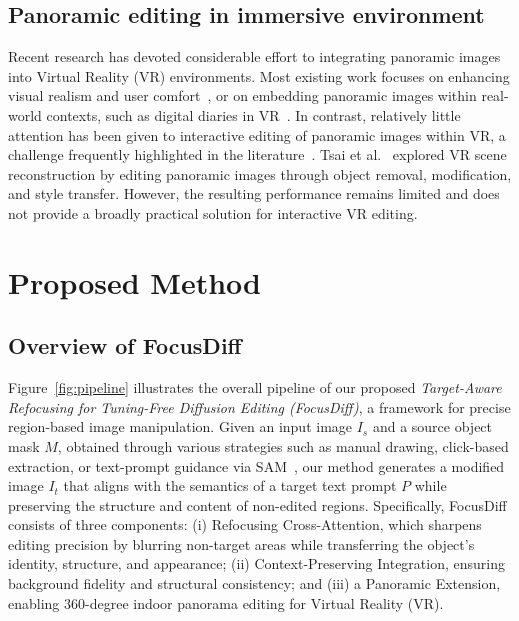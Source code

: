 \documentclass[runningheads]{llncs}
\begin{document}
\subsection{Panoramic editing in immersive environment}
Recent research has devoted considerable effort to integrating panoramic images into Virtual Reality (VR) environments. Most existing work focuses on enhancing visual realism and user comfort~\cite{LayerPano3D,Real_Time_Omnidirectional,PanoTrace,Huang_2025_CVPR}, or on embedding panoramic images within real-world contexts, such as digital diaries in VR~\cite{Digital_dỉaries}. In contrast, relatively little attention has been given to interactive editing of panoramic images within VR, a challenge frequently highlighted in the literature~\cite{tukur2025panoramic}. Tsai et al.~\cite{DreamCraft} explored VR scene reconstruction by editing panoramic images through object removal, modification, and style transfer. However, the resulting performance remains limited and does not provide a broadly practical solution for interactive VR editing.


\section{Proposed Method}

\subsection{Overview of FocusDiff} 

Figure~\ref{fig:pipeline} illustrates the overall pipeline of our proposed \textit{Target-Aware Refocusing for Tuning-Free Diffusion Editing (FocusDiff)}, a framework for precise region-based image manipulation. Given an input image $I_s$ and a source object mask $M$, obtained through various strategies such as manual drawing, click-based extraction, or text-prompt guidance via SAM~\cite{kirillov2023segment}, our method generates a modified image $I_t$ that aligns with the semantics of a target text prompt $P$ while preserving the structure and content of non-edited regions. Specifically, FocusDiff consists of three components: (i) {Refocusing Cross-Attention}, which sharpens editing precision by blurring non-target areas while transferring the object’s identity, structure, and appearance; (ii) Context-Preserving Integration, ensuring background fidelity and structural consistency; and (iii) a Panoramic Extension, enabling 360-degree indoor panorama editing for Virtual Reality (VR).
\end{document}
